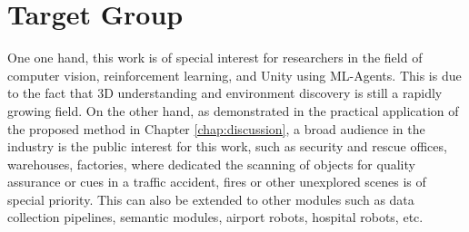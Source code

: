 \section{Target Group}\label{chap:1:target-group}
One one hand, this work is of special interest for researchers in the field of computer vision, reinforcement learning, and Unity using ML-Agents. This is due to the fact that 3D understanding and environment discovery is still a rapidly growing field.  
On the other hand, as demonstrated in the practical application of the proposed method in Chapter \ref{chap:discussion}, a broad audience in the industry is the public interest for this work, such as security and rescue offices, warehouses, factories, where dedicated the scanning of objects for quality assurance or cues in a traffic accident, fires or other unexplored scenes is of special priority. 
This can also be extended to other modules such as data collection pipelines, semantic modules, airport robots, hospital robots, etc.





